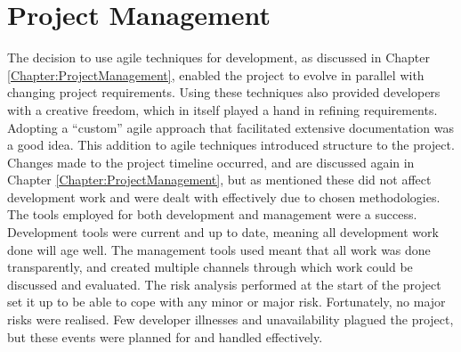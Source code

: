 \section{Project Management}
The decision to use agile techniques for development, as discussed in Chapter \ref{Chapter:ProjectManagement}, enabled the project to evolve in parallel with changing project requirements. Using these techniques also provided developers with a creative freedom, which in itself played a hand in refining requirements. Adopting a ``custom'' agile approach that facilitated extensive documentation was a good idea. This addition to agile techniques introduced structure to the project. Changes made to the project timeline occurred, and are discussed again in Chapter \ref{Chapter:ProjectManagement}, but as mentioned these did not affect development work and were dealt with effectively due to chosen methodologies. The tools employed for both development and management were a success. Development tools were current and up to date, meaning all development work done will age well. The management tools used meant that all work was done transparently, and created multiple channels through which work could be discussed and evaluated. The risk analysis performed at the start of the project set it up to be able to cope with any minor or major risk. Fortunately, no major risks were realised. Few developer illnesses and unavailability plagued the project, but these events were planned for and handled effectively.